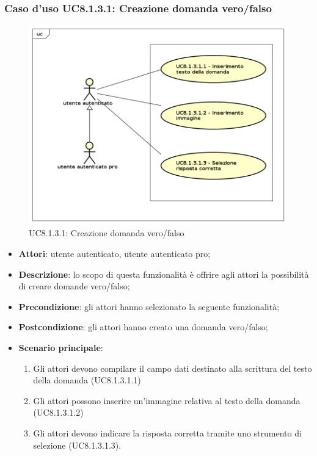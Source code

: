 \subsubsection{Caso d'uso UC8.1.3.1: Creazione domanda vero/falso}
	\label{UC8.1.3.1}
	\begin{figure}[h]
		\centering
			\includegraphics[scale=0.45,keepaspectratio]{UML/UC8_1_3_1.png}
		\caption{UC8.1.3.1: Creazione domanda vero/falso}
	\end{figure}
	\FloatBarrier
	\begin{itemize}
		\item
			\textbf{Attori}: utente autenticato, utente autenticato pro;
		\item		
			\textbf{Descrizione}: lo scopo di questa funzionalità è offrire agli attori la possibilità di creare domande vero/falso;
		\item
			\textbf{Precondizione}: gli attori hanno selezionato la seguente funzionalità; 
		\item
			\textbf{Postcondizione}: gli attori hanno creato una domanda vero/falso;
		\item
			\textbf{Scenario principale}:
	       		\begin{enumerate}
	       			\item
	       			Gli attori devono compilare il campo dati destinato alla scrittura del testo della domanda (UC8.1.3.1.1)
	       			\item
	       			Gli attori possono inserire un'immagine relativa al testo della domanda (UC8.1.3.1.2)
					\item
					Gli attori devono indicare la risposta corretta tramite uno strumento di selezione (UC8.1.3.1.3).
	 			\end{enumerate}
	\end{itemize}

